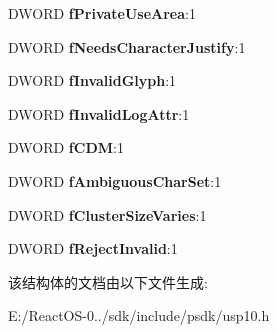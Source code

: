 \begin{DoxyCompactItemize}
\mbox{\label{struct_s_c_r_i_p_t___p_r_o_p_e_r_t_i_e_s_aa82f815afa2b8065b1b49d841f3afaaf}} 
D\+W\+O\+RD {\bfseries f\+Private\+Use\+Area}\+:1
\item 
\mbox{\label{struct_s_c_r_i_p_t___p_r_o_p_e_r_t_i_e_s_a9974f3ec69403308907e39f4ec7d5307}} 
D\+W\+O\+RD {\bfseries f\+Needs\+Character\+Justify}\+:1
\item 
\mbox{\label{struct_s_c_r_i_p_t___p_r_o_p_e_r_t_i_e_s_a649603b657f2282370dc9959348b9039}} 
D\+W\+O\+RD {\bfseries f\+Invalid\+Glyph}\+:1
\item 
\mbox{\label{struct_s_c_r_i_p_t___p_r_o_p_e_r_t_i_e_s_a39568dd5564d4ba9e29721a331464206}} 
D\+W\+O\+RD {\bfseries f\+Invalid\+Log\+Attr}\+:1
\item 
\mbox{\label{struct_s_c_r_i_p_t___p_r_o_p_e_r_t_i_e_s_ace9f46feb6d0f63da7be5061f8cd43ef}} 
D\+W\+O\+RD {\bfseries f\+C\+DM}\+:1
\item 
\mbox{\label{struct_s_c_r_i_p_t___p_r_o_p_e_r_t_i_e_s_a2ab3076e496665c49133430d17a0f8f8}} 
D\+W\+O\+RD {\bfseries f\+Ambiguous\+Char\+Set}\+:1
\item 
\mbox{\label{struct_s_c_r_i_p_t___p_r_o_p_e_r_t_i_e_s_ada7cb50dde12a88d19404c103b0b7a06}} 
D\+W\+O\+RD {\bfseries f\+Cluster\+Size\+Varies}\+:1
\item 
\mbox{\label{struct_s_c_r_i_p_t___p_r_o_p_e_r_t_i_e_s_a1735dc26653f45aefcad2d55bd472058}} 
D\+W\+O\+RD {\bfseries f\+Reject\+Invalid}\+:1
\end{DoxyCompactItemize}


该结构体的文档由以下文件生成\+:\begin{DoxyCompactItemize}
\item 
E\+:/\+React\+O\+S-\/0../sdk/include/psdk/usp10.\+h\end{DoxyCompactItemize}
